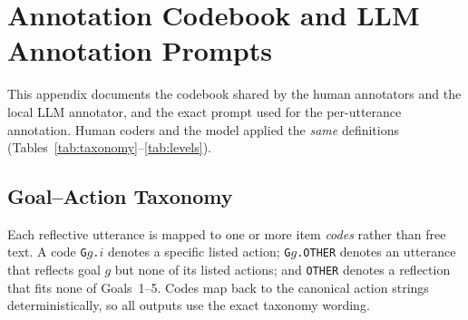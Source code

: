 \section{Annotation Codebook and LLM Annotation Prompts}
\label{app:codebook}

This appendix documents the codebook shared by the human annotators and the local
LLM annotator, and the exact prompt used for the per-utterance annotation. Human
coders and the model applied the \emph{same} definitions (Tables~\ref{tab:taxonomy}--\ref{tab:levels}).

\subsection{Goal--Action Taxonomy}
\label{app:taxonomy}

Each reflective utterance is mapped to one or more item \emph{codes} rather than free
text. A code \texttt{G$g$.$i$} denotes a specific listed action; \texttt{G$g$.OTHER}
denotes an utterance that reflects goal $g$ but none of its listed actions; and
\texttt{OTHER} denotes a reflection that fits none of Goals~1--5. Codes map back to the
canonical action strings deterministically, so all outputs use the exact taxonomy wording.

